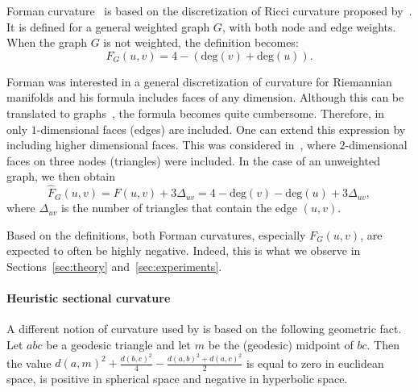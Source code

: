 \documentclass{article} %
\begin{document}
Forman curvature~\citep{sreejith2016forman} is based on the discretization of Ricci curvature proposed by~\citet{forman2003bochner}. It is defined for a general weighted graph $G$, with both node and edge weights. %
When the graph $G$ is not weighted, 
the definition becomes:
\begin{equation}\label{eq:forman1}
F_G(u,v) 
= 4 - (\mathrm{deg}(v) + \mathrm{deg}(u)).
\end{equation}

Forman was interested in a general discretization of curvature for Riemannian manifolds and his formula includes faces of any dimension. Although this can be translated to graphs~\citep{weber2017coarse}, the formula becomes quite cumbersome. Therefore, in~ only $1$-dimensional faces (edges) are included. One can extend this expression by including higher dimensional faces. This was considered in~\citep{samal2018comparative}, where $2$-dimensional faces on three nodes (triangles) were included. In the case of an unweighted graph, we then obtain
\begin{equation}\label{eq:forman2}
	\hat F_G(u,v) = F(u,v) + 3\Delta_{uv} 
	= 4 - \mathrm{deg}(v) - \mathrm{deg}(u) + 3\Delta_{uv},
\end{equation}
where $\Delta_{uv}$ is the number of triangles that contain the edge $(u,v)$. 

Based on the definitions, both Forman curvatures, especially $F_G(u,v)$, are expected to often be highly negative. Indeed, this is what we observe in Sections~\ref{sec:theory} and~\ref{sec:experiments}.

\paragraph{Heuristic sectional curvature}

A different notion of curvature used by \citet{gu2019learning} is based on the following geometric fact. 
Let $abc$ be a geodesic triangle and let $m$ be the (geodesic) midpoint of $bc$. Then the value
$	d(a,m)^2 + \frac{d(b,c)^2}{4} - \frac{d(a,b)^2 + d(a,c)^2}{2}$
is equal to zero in euclidean space, is positive in spherical space and negative in hyperbolic space.
\end{document}
